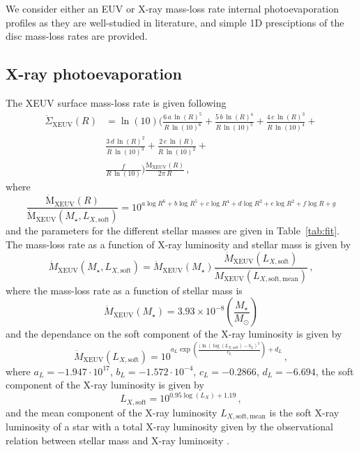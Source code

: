 \documentclass[fleqn,usenatbib,letters]{mnras}
\begin{document}
We consider either an EUV or X-ray mass-loss rate internal photoevaporation profiles as they are well-studied in literature, and simple 1D presciptions of the disc mass-loss rates are provided.

\subsection{X-ray photoevaporation}

The XEUV surface mass-loss rate is given following \citet{Picogna2019}
\begin{eqnarray}
  \label{eq:surf1}
  \dot{\Sigma}_\mathrm{XEUV}(R) &= \ln{(10)} \bigg(\frac{6\, a\, \ln{(R)}^5}{R\, \ln{(10)}^6} +
  \frac{5\, b\, \ln{(R)}^4}{R\, \ln{(10)}^5} +
  \frac{4\, c\, \ln{(R)}^3}{R\, \ln{(10)}^4} + \\ \nonumber
  &\frac{3\, d\, \ln{(R)}^2}{R\, \ln{(10)}^3} +
  \frac{2\, e\, \ln{(R)}}{R\, \ln{(10)}^2} + \\ \nonumber
  &\frac{f}{R\, \ln{(10)}}\bigg)
  \frac{\dot{\mathrm{M}}_\mathrm{XEUV}(R)}{2\pi\, R} \,,
\end{eqnarray}
where
\begin{equation}
\label{eq:surf2}
  \frac{\dot{\mathrm{M}}_\mathrm{XEUV}(R)}{\dot{\mathrm{M}}_\mathrm{XEUV}(M_\star, L_{X,\mathrm{soft}})} = 10^{a\log{R}^6 + b\log{R}^5 + c\log{R}^4 + d\log{R}^3 + e\log{R}^2 + f\log{R} + g}
\end{equation}
and the parameters for the different stellar masses are given in Table~\ref{tab:fit}.
The mass-loss rate as a function of X-ray luminosity and stellar mass is given by \citep{Ercolano2021,Picogna2021}
\begin{equation}
    \dot{M}_\mathrm{XEUV}(M_\star, L_{X,\mathrm{soft}}) = \dot{M}_\mathrm{XEUV}(M_\star)\frac{\dot{M}_\mathrm{XEUV}(L_{X,\mathrm{soft}})}{\dot{M}_\mathrm{XEUV}(L_{X,\mathrm{soft, mean}})} \,,
\end{equation}
where the mass-loss rate as a function of stellar mass is 
\begin{equation}
    \dot{M}_\mathrm{XEUV}(M_\star) = 3.93\times10^{-8} \left(\frac{M_\star}{M_\odot}\right)
\end{equation}
and the dependance on the soft component of the X-ray luminosity is given by
\begin{equation}
    \dot{M}_\mathrm{XEUV}(L_{X,\mathrm{soft}}) = 10^{a_L \exp{\left(\frac{(\ln(\log(L_{X,\mathrm{soft}})-b_L)^2}{c_L}\right)+d_L}} \,,
\end{equation}
where $a_L = -1.947\cdot 10^{17}$, $b_L = -1.572\cdot 10^{-4}$, $c_L = -0.2866$, $d_L = -6.694$, the soft component of the X-ray luminosity is given by
\begin{equation}
    L_{X,\mathrm{soft}} = 10^{0.95 \log{(L_X)}+1.19} \,,
\end{equation}
and the mean component of the X-ray luminosity $L_{X,\mathrm{soft, mean}}$ is the soft X-ray luminosity of a star with a total X-ray luminosity given by the observational relation between stellar mass and X-ray luminosity \citep[see eq.~\ref{eq:LxMstar}, ][]{Gudel2007}.
\end{document}
